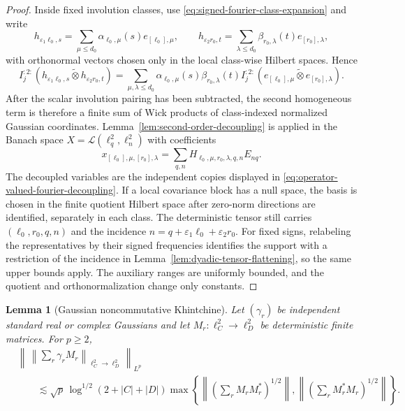 \documentclass[10pt]{amsart}
\numberwithin{equation}{section}
\theoremstyle{plain}
\newtheorem{lemma}[theorem]{Lemma}
\theoremstyle{definition}
\theoremstyle{remark}
\begin{document}
\begin{proof}
Inside fixed involution classes, use \eqref{eq:signed-fourier-class-expansion} and write
\[
        h_{\varepsilon_1\ell_0,s}
        =\sum_{\mu\le d_0}\alpha_{\ell_0,\mu}(s)e_{[\ell_0],\mu},
        \qquad
        h_{\varepsilon_2r_0,t}
        =\sum_{\lambda\le d_0}\beta_{r_0,\lambda}(t)e_{[r_0],\lambda},
\]
with orthonormal vectors chosen only in the local class-wise Hilbert spaces.  Hence
\[
        I_j^{:2:}(h_{\varepsilon_1\ell_0,s}
                  \widetilde\otimes h_{\varepsilon_2r_0,t})
        =\sum_{\mu,\lambda\le d_0}
          \alpha_{\ell_0,\mu}(s)\beta_{r_0,\lambda}(t)
          I_j^{:2:}(e_{[\ell_0],\mu}\widetilde\otimes e_{[r_0],\lambda}).
\]
After the scalar involution pairing has been subtracted, the second homogeneous term is therefore a finite sum of Wick products of class-indexed normalized Gaussian coordinates.  Lemma~\ref{lem:second-order-decoupling} is applied in the Banach space $X=\mathcal L(\ell_q^2,\ell_n^2)$ with coefficients
\[
        x_{[\ell_0],\mu,[r_0],\lambda}
        =\sum_{q,n}H_{\ell_0,\mu,r_0,\lambda,q,n}E_{nq}.
\]
The decoupled variables are the independent copies displayed in \eqref{eq:operator-valued-fourier-decoupling}.  If a local covariance block has a null space, the basis is chosen in the finite quotient Hilbert space after zero-norm directions are identified, separately in each class.  The deterministic tensor still carries $(\ell_0,r_0,q,n)$ and the incidence $n=q+\varepsilon_1\ell_0+\varepsilon_2r_0$.  For fixed signs, relabeling the representatives by their signed frequencies identifies the support with a restriction of the incidence in Lemma~\ref{lem:dyadic-tensor-flattening}, so the same upper bounds apply.  The auxiliary ranges are uniformly bounded, and the quotient and orthonormalization change only constants.
\end{proof}

\begin{lemma}[Gaussian noncommutative Khintchine]\label{lem:gaussian-nck}
Let $(\gamma_r)$ be independent standard real or complex Gaussians and let $M_r:\ell_C^2\to\ell_D^2$ be deterministic finite matrices.  For $p\ge2$,
\begin{align}\label{eq:gaussian-nck}
&\left\|\,\left\|\sum_r\gamma_rM_r\right\|_{\ell_C^2\to\ell_D^2}\,\right\|_{L^p}
\nonumber\\
&\qquad\lesssim
\sqrt p\,\log^{1/2}(2+|C|+|D|)
\max\left\{
\left\|\left(\sum_rM_rM_r^*\right)^{1/2}\right\|,
\left\|\left(\sum_rM_r^*M_r\right)^{1/2}\right\|
\right\}.
\end{align}
\end{lemma}
\end{document}
